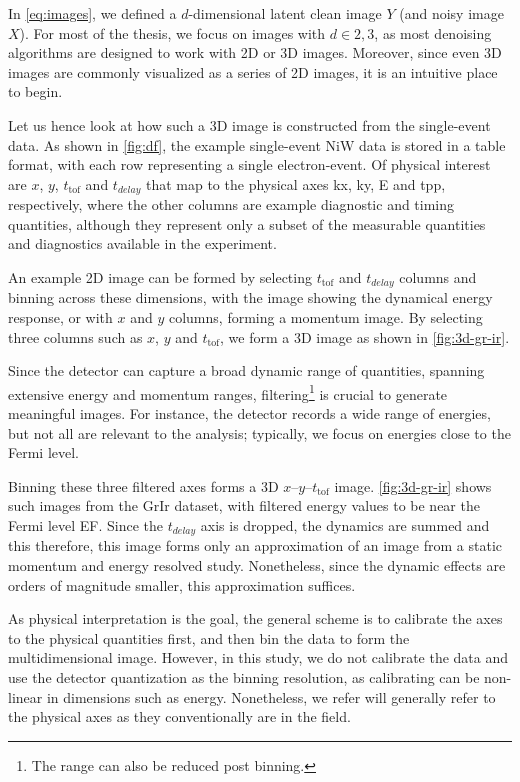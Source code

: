 In \cref{eq:images}, we defined a $d$-dimensional latent clean image $Y$ (and noisy image $X$). For most of the thesis, we focus on images with $d \in {2,3}$, as most denoising algorithms are designed to work with 2D or 3D images. Moreover, since even 3D images are commonly visualized as a series of 2D images, it is an intuitive place to begin. 

Let us hence look at how such a 3D image is constructed from the single-event data. As shown in \cref{fig:df}, the example single-event \gls{NiW} data is stored in a table format, with each row representing a single electron-event. Of physical interest are $x$, $y$, $t_{\text{tof}}$ and $t_{delay}$ that map to the physical axes \gls{kx}, \gls{ky}, \gls{E} and \gls{tpp}, respectively, where the other columns are example diagnostic and timing quantities, although they represent only a subset of the measurable quantities and diagnostics available in the experiment.

An example 2D image can be formed by selecting $t_{\text{tof}}$ and $t_{delay}$ columns and binning across these dimensions, with the image showing the dynamical energy response, or with $x$ and $y$ columns, forming a momentum image. By selecting three columns such as $x$, $y$ and $t_{\text{tof}}$, we form a 3D image as shown in \cref{fig:3d-gr-ir}.

Since the detector can capture a broad dynamic range of quantities, spanning extensive energy and momentum ranges, filtering\footnote{The range can also be reduced post binning.} is crucial to generate meaningful images. For instance, the detector records a wide range of energies, but not all are relevant to the analysis; typically, we focus on energies close to the Fermi level. 

Binning these three filtered axes forms a 3D $x$--$y$--$t_{\text{tof}}$ image. \cref{fig:3d-gr-ir} shows such images from the \gls{GrIr} dataset, with filtered energy values to be near the Fermi level \gls{EF}. Since the $t_{delay}$ axis is dropped, the dynamics are summed and this therefore, this image forms only an approximation of an image from a static momentum and energy resolved study. Nonetheless, since the dynamic effects are orders of magnitude smaller, this approximation suffices.

As physical interpretation is the goal, the general scheme is to calibrate the axes to the physical quantities first, and then bin the data to form the multidimensional image. However, in this study, we do not calibrate the data and use the detector quantization as the binning resolution, as calibrating can be non-linear in dimensions such as energy. Nonetheless, we refer will generally refer to the physical axes as they conventionally are in the field.

